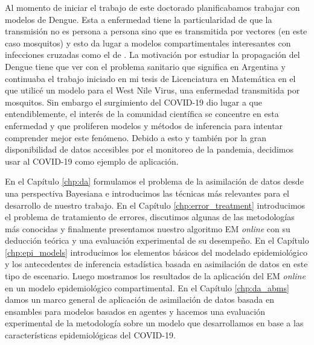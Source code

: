 Al momento de iniciar el trabajo de este doctorado planificabamos trabajar con modelos de Dengue. Esta a enfermedad tiene la particularidad de que la transmisión no es persona a persona sino que es transmitida por vectores (en este caso mosquitos) y esto da lugar a modelos compartimentales interesantes con infecciones cruzadas como el de \cite{Kenkre2005}. La motivación por estudiar la propagación del Dengue tiene que ver con el problema sanitario que significa en Argentina y continuaba el trabajo iniciado en mi tesis de Licenciatura en Matemática \citep{Cocucci2015} en el que utilicé un modelo para el West Nile Virus, una enfermedad transmitida por mosquitos. Sin embargo el surgimiento del COVID-19 dio lugar a que entendiblemente, el interés de la comunidad científica se concentre en esta enfermedad y que proliferen modelos y métodos de inferencia para intentar comprender mejor este fenómeno. Debido a esto y también por la gran disponibilidad de datos accesibles por el monitoreo de la pandemia, decidimos usar al COVID-19 como ejemplo de aplicación.

En el Capítulo \ref{chp:da} formulamos el problema de la asimilación de datos desde una perspectiva Bayesiana e introducimos las técnicas más relevantes para el desarrollo de nuestro trabajo. En el Capítulo \ref{chp:error_treatment} introducimos el problema de tratamiento de errores, discutimos algunas de las metodologías más conocidas y finalmente presentamos nuestro algoritmo EM \textit{online} con su deducción teórica y una evaluación experimental de su desempeño. En el Capítulo \ref{chp:epi_models} introducimos los elementos básicos del modelado epidemiológico y los antecedentes de inferencia estadística basada en asimilación de datos en este tipo de escenario. Luego mostramos los resultados de la aplicación del EM \textit{online} en un modelo epidemiológico compartimental. En el Capítulo \ref{chp:da_abms} damos un marco general de aplicación de asimilación de datos basada en ensambles para modelos basados en agentes y hacemos una evaluación experimental de la metodología sobre un modelo que desarrollamos en base a las características epidemiológicas del COVID-19.
